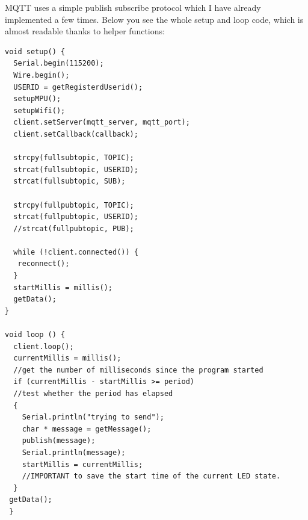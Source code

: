 MQTT uses a simple publish subscribe protocol which I have already implemented a few times.
Below you see the whole setup and loop code, which is almost readable thanks to helper functions:
\begin{lstlisting}
void setup() {
  Serial.begin(115200);
  Wire.begin();
  USERID = getRegisterdUserid();
  setupMPU();
  setupWifi();
  client.setServer(mqtt_server, mqtt_port);
  client.setCallback(callback);

  strcpy(fullsubtopic, TOPIC); 
  strcat(fullsubtopic, USERID);
  strcat(fullsubtopic, SUB);
  
  strcpy(fullpubtopic, TOPIC); 
  strcat(fullpubtopic, USERID);
  //strcat(fullpubtopic, PUB);
  
  while (!client.connected()) {
   reconnect();
  }
  startMillis = millis(); 
  getData();
}

void loop () {
  client.loop();
  currentMillis = millis();  
  //get the number of milliseconds since the program started
  if (currentMillis - startMillis >= period)  
  //test whether the period has elapsed
  {
    Serial.println("trying to send");
    char * message = getMessage();
    publish(message);
    Serial.println(message);
    startMillis = currentMillis;  
    //IMPORTANT to save the start time of the current LED state.
  }
 getData();
 }
\end{lstlisting}

